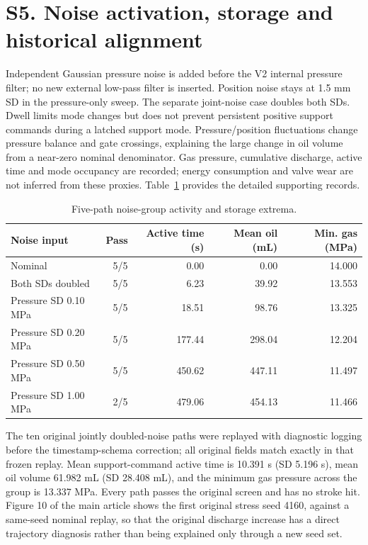 \documentclass[11pt,a4paper]{article}
\begin{document}
\section*{S5. Noise activation, storage and historical alignment}
Independent Gaussian pressure noise is added before the V2 internal pressure filter; no new external low-pass filter is inserted. Position noise stays at 1.5 mm SD in the pressure-only sweep. The separate joint-noise case doubles both SDs. Dwell limits mode changes but does not prevent persistent positive support commands during a latched support mode. Pressure/position fluctuations change pressure balance and gate crossings, explaining the large change in oil volume from a near-zero nominal denominator. Gas pressure, cumulative discharge, active time and mode occupancy are recorded; energy consumption and valve wear are not inferred from these proxies.
Table~\ref{supp:table:2} provides the detailed supporting records.
\begin{table}[H]\centering\caption{Five-path noise-group activity and storage extrema.}\label{supp:table:2}\begin{tabularx}{\linewidth}{Xrrrr}\toprule Noise input & Pass & Active time (s) & Mean oil (mL) & Min. gas (MPa)\\\midrule
Nominal & 5/5 & 0.00 & 0.00 & 14.000 \\
Both SDs doubled & 5/5 & 6.23 & 39.92 & 13.553 \\
Pressure SD 0.10 MPa & 5/5 & 18.51 & 98.76 & 13.325 \\
Pressure SD 0.20 MPa & 5/5 & 177.44 & 298.04 & 12.204 \\
Pressure SD 0.50 MPa & 5/5 & 450.62 & 447.11 & 11.497 \\
Pressure SD 1.00 MPa & 2/5 & 479.06 & 454.13 & 11.466 \\
\bottomrule\end{tabularx}\end{table}
The ten original jointly doubled-noise paths were replayed with diagnostic logging before the timestamp-schema correction; all original fields match exactly in that frozen replay. Mean support-command active time is 10.391 s (SD 5.196 s), mean oil volume 61.982 mL (SD 28.408 mL), and the minimum gas pressure across the group is 13.337 MPa. Every path passes the original screen and has no stroke hit. Figure 10 of the main article shows the first original stress seed 4160, against a same-seed nominal replay, so that the original discharge increase has a direct trajectory diagnosis rather than being explained only through a new seed set.
\end{document}
